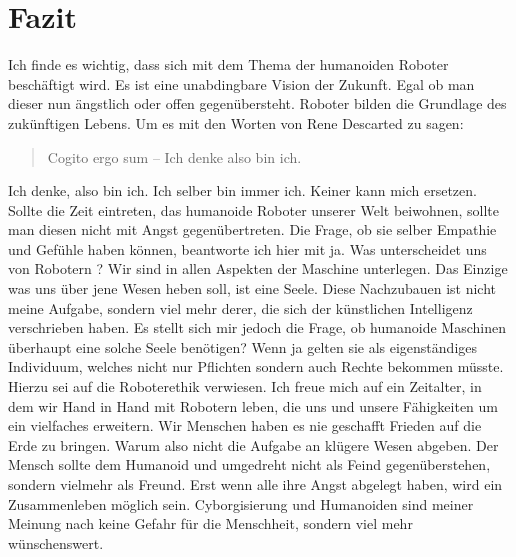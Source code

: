 %
%
%
%
\newpage

\chapter{Fazit}
Ich finde es wichtig, dass sich mit dem Thema der humanoiden Roboter beschäftigt wird. Es ist eine unabdingbare Vision der Zukunft. Egal ob man dieser nun ängstlich oder offen gegenübersteht. Roboter bilden die Grundlage des zukünftigen Lebens. Um es mit den Worten von Rene Descarted zu sagen: 
\begin{quote}
	Cogito ergo sum – Ich denke also bin ich.
\end{quote}
Ich denke, also bin ich. Ich selber bin immer ich. Keiner kann mich ersetzen. Sollte die Zeit eintreten, das humanoide Roboter unserer Welt beiwohnen, sollte man diesen nicht mit Angst gegenübertreten. Die Frage, ob sie selber Empathie und Gefühle haben können, beantworte ich hier mit ja. Was unterscheidet uns von Robotern ? Wir sind in allen Aspekten der Maschine unterlegen. Das Einzige was uns über jene Wesen heben soll, ist eine Seele. Diese Nachzubauen ist nicht meine Aufgabe, sondern viel mehr derer, die sich der künstlichen Intelligenz verschrieben haben. Es stellt sich mir jedoch die Frage, ob humanoide Maschinen überhaupt eine solche Seele benötigen? Wenn ja gelten sie als eigenständiges Individuum, welches nicht nur Pflichten sondern auch Rechte bekommen müsste. Hierzu sei auf die Roboterethik verwiesen. Ich freue mich auf ein Zeitalter, in dem wir Hand in Hand mit Robotern leben, die uns und unsere Fähigkeiten um ein vielfaches erweitern. Wir Menschen haben es nie geschafft Frieden auf die Erde zu bringen. Warum also nicht die Aufgabe an klügere Wesen abgeben. Der Mensch sollte dem Humanoid und umgedreht nicht als Feind gegenüberstehen, sondern vielmehr als Freund. Erst wenn alle ihre Angst abgelegt haben, wird ein Zusammenleben möglich sein. Cyborgisierung und Humanoiden sind meiner Meinung nach keine Gefahr für die Menschheit, sondern viel mehr wünschenswert.
